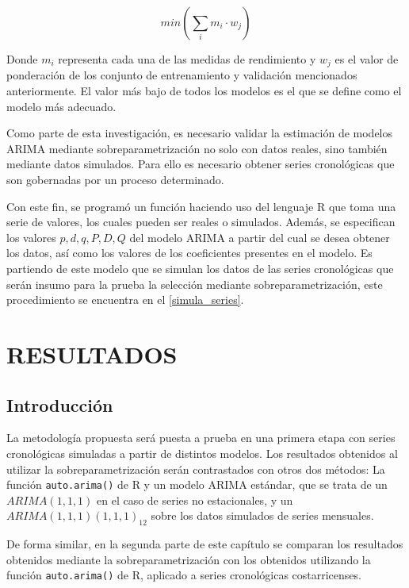 \documentclass[
]{article}
\begin{document}
\begin{equation}
\label{eqn:concenso}
min\left( \sum_i {m_i}\cdot w_j \right)
\end{equation}

Donde \(m_i\) representa cada una de las medidas de rendimiento y
\(w_j\) es el valor de ponderación de los conjunto de entrenamiento y
validación mencionados anteriormente. El valor más bajo de todos los
modelos es el que se define como el modelo más adecuado.

Como parte de esta investigación, es necesario validar la estimación de
modelos ARIMA mediante sobreparametrización no solo con datos reales,
sino también mediante datos simulados. Para ello es necesario obtener
series cronológicas que son gobernadas por un proceso determinado.

Con este fin, se programó un función haciendo uso del lenguaje R que
toma una serie de valores, los cuales pueden ser reales o simulados.
Además, se especifican los valores \(p,d,q,P,D,Q\) del modelo ARIMA a
partir del cual se desea obtener los datos, así como los valores de los
coeficientes presentes en el modelo. Es partiendo de este modelo que se
simulan los datos de las series cronológicas que serán insumo para la
prueba la selección mediante sobreparametrización, este procedimiento se
encuentra en el \ref{simula_series}.

\newpage

\section{RESULTADOS}

\subsection{Introducción}

La metodología propuesta será puesta a prueba en una primera etapa con
series cronológicas simuladas a partir de distintos modelos. Los
resultados obtenidos al utilizar la sobreparametrización serán
contrastados con otros dos métodos: La función \texttt{auto.arima()} de
R y un modelo ARIMA estándar, que se trata de un \(ARIMA(1,1,1)\) en el
caso de series no estacionales, y un \(ARIMA(1,1,1)(1,1,1)_{12}\) sobre
los datos simulados de series mensuales.

De forma similar, en la segunda parte de este capítulo se comparan los
resultados obtenidos mediante la sobreparametrización con los obtenidos
utilizando la función \texttt{auto.arima()} de R, aplicado a series
cronológicas costarricenses.
\end{document}
